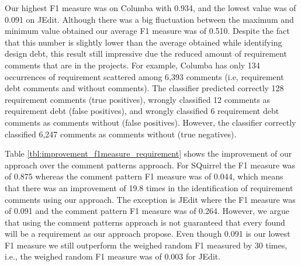 Our highest F1 measure was on Columba with 0.934, and the lowest value was of 0.091 on JEdit. Although there was a big fluctuation between the maximum and minimum value obtained our average F1 measure was of 0.510. Despite the fact that this number is slightly lower than the average obtained while  identifying design debt, this result still impressive due the reduced amount of requirement \SATD comments that are in the projects. For example, Columba has only 134 occurrences of requirement \SATD scattered among 6,393 comments (i.e, requirement debt comments and without \SATD comments). The classifier predicted correctly 128 requirement \SATD comments (true positives), wrongly classified 12 comments as requirement debt (false positives), and wrongly classified 6 requirement debt comments as comments without \SATD (false positives). However, the classifier correctly classified 6,247 comments as comments without \SATD (true negatives).

Table \ref{tbl:improvement_f1measure_requirement} shows the improvement of our approach over the comment patterns approach. For SQuirrel the F1 measure was of 0.875 whereas the comment pattern F1 measure was of 0.044, which means that there was an improvement of 19.8 times in the identification of requirement \SATD comments using our approach. The exception is JEdit where the F1 measure was of 0.091 and the comment pattern F1 measure was of 0.264. However, we argue that using the comment patterns approach is not guaranteed that every \SATD found will be a requirement \SATD as our approach propose. Even though 0.091 is our lowest F1 measure we still outperform the weighed random F1 measured by 30 times, i.e., the weighed random F1 measure was of 0.003 for JEdit. 

